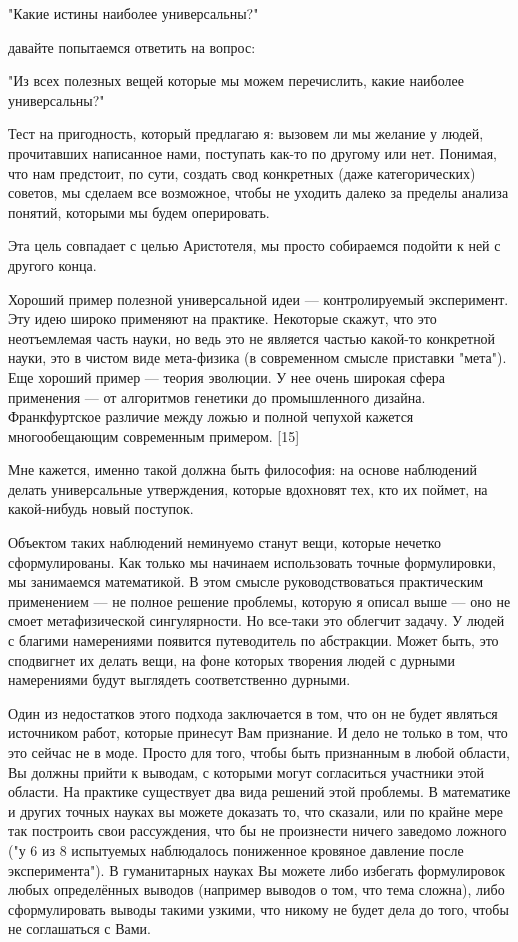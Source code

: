 \documentclass[ebook,12pt,oneside,openany]{memoir}
\begin{document}
"Какие истины наиболее универсальны?"

давайте попытаемся ответить на вопрос:

"Из всех полезных вещей которые мы можем перечислить, какие наиболее
универсальны?"

Тест на пригодность, который предлагаю я: вызовем ли мы желание у
людей, прочитавших написанное нами, поступать как-то по другому или
нет. Понимая, что нам предстоит, по сути, создать свод конкретных
(даже категорических) советов, мы сделаем все возможное, чтобы не
уходить далеко за пределы анализа понятий, которыми мы будем
оперировать.

Эта цель совпадает с целью Аристотеля, мы просто собираемся подойти к
ней с другого конца.

Хороший пример полезной универсальной идеи — контролируемый
эксперимент. Эту идею широко применяют на практике. Некоторые скажут,
что это неотъемлемая часть науки, но ведь это не является частью
какой-то конкретной науки, это в чистом виде мета-физика (в
современном смысле приставки "мета"). Еще хороший пример — теория
эволюции. У нее очень широкая сфера применения — от алгоритмов
генетики до промышленного дизайна. Франкфуртское различие между ложью
и полной чепухой кажется многообещающим современным примером. [15]

Мне кажется, именно такой должна быть философия: на основе наблюдений
делать универсальные утверждения, которые вдохновят тех, кто их
поймет, на какой-нибудь новый поступок.

Объектом таких наблюдений неминуемо станут вещи, которые нечетко
сформулированы. Как только мы начинаем использовать точные
формулировки, мы занимаемся математикой. В этом смысле
руководствоваться практическим применением — не полное решение
проблемы, которую я описал выше — оно не смоет метафизической
сингулярности. Но все-таки это облегчит задачу. У людей с благими
намерениями появится путеводитель по абстракции. Может быть, это
сподвигнет их делать вещи, на фоне которых творения людей с дурными
намерениями будут выглядеть соответственно дурными.

Один из недостатков этого подхода заключается в том, что он не будет
являться источником работ, которые принесут Вам признание. И дело не
только в том, что это сейчас не в моде. Просто для того, чтобы быть
признанным в любой области, Вы должны прийти к выводам, с которыми
могут согласиться участники этой области. На практике существует два
вида решений этой проблемы. В математике и других точных науках вы
можете доказать то, что сказали, или по крайне мере так построить свои
рассуждения, что бы не произнести ничего заведомо ложного ("у 6 из 8
испытуемых наблюдалось пониженное кровяное давление после
эксперимента"). В гуманитарных науках Вы можете либо избегать
формулировок любых определённых выводов (например выводов о том, что
тема сложна), либо сформулировать выводы такими узкими, что никому не
будет дела до того, чтобы не соглашаться с Вами.
\end{document}

